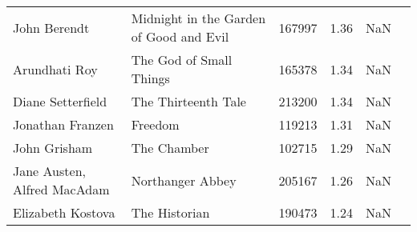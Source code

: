 \begin{tabular}{p{4cm}p{5cm}llll}
                                    John Berendt &            Midnight in the Garden of Good and Evil &         167997 &   1.36 &     NaN \\
                                   Arundhati Roy &                            The God of Small Things &         165378 &   1.34 &     NaN \\
                               Diane Setterfield &                                The Thirteenth Tale &         213200 &   1.34 &     NaN \\
                                Jonathan Franzen &                                            Freedom &         119213 &   1.31 &     NaN \\
                                    John Grisham &                                        The Chamber &         102715 &   1.29 &     NaN \\
                     Jane Austen, Alfred MacAdam &                                   Northanger Abbey &         205167 &   1.26 &     NaN \\
                               Elizabeth Kostova &                                      The Historian &         190473 &   1.24 &     NaN \\
\bottomrule
\end{tabular}

